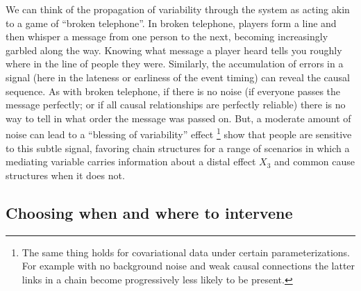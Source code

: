 \documentclass{cambridge7A}%
\begin{document}
We can think of the propagation of variability through the system as acting akin to a game of ``broken telephone''.  In broken telephone, players form a line and then whisper a message from one person to the next, becoming increasingly garbled along the way.  Knowing what message a player heard tells you roughly where in the line of people they were.  Similarly, the accumulation of errors in a signal (here in the lateness or earliness of the event timing) can reveal the causal sequence.  As with broken telephone, if there is no noise (if everyone passes the message perfectly; or if all causal relationships are perfectly reliable) there is no way to tell in what order the message was passed on. But, a moderate amount of noise can lead to a ``blessing of variability'' effect \footnote{The same thing holds for covariational data under certain parameterizations.  For example with no background noise and weak causal connections the latter links in a chain become progressively less likely to be present.}   \cite{bramley2018time} show that people are sensitive to this subtle signal, favoring chain structures for a range of scenarios in which a mediating variable carries information about a distal effect $X_3$ and common cause structures when it does not.%





\subsection{Choosing when and where to intervene}
\end{document}
